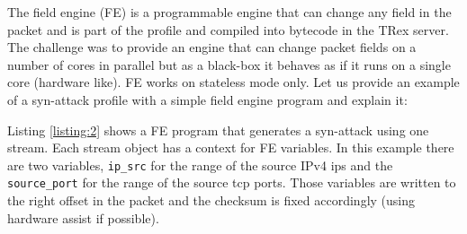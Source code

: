 \documentclass[letterpaper]{article}
\begin{document}
The field engine (FE) is a programmable engine that can change any field in the packet and is part of the profile and compiled into bytecode in the TRex server. 
The challenge was to provide an engine that can change packet fields on a number of cores in parallel but as a black-box it behaves as if it runs on a single core (hardware like).
FE works on stateless mode only. Let us provide an example of a syn-attack profile with a simple field engine program and explain it:

  
Listing \ref{listing:2} shows a FE program that generates a syn-attack using one stream. 
Each stream object has a context for FE variables. In this example there are two variables,
\texttt{ip\_src} for the range of the source IPv4 ips and the \texttt{source\_port} for the range of the source tcp ports.
Those variables are written to the right offset in the packet and the checksum is fixed accordingly (using hardware assist if possible).
\end{document}

